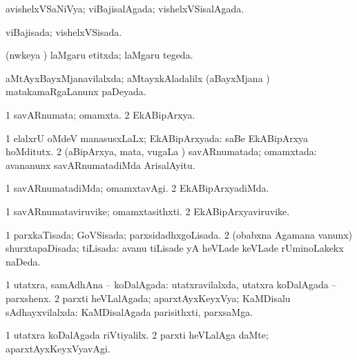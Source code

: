 \bentry
{} 
\gl{\gu}
\expl{}
\bmng
avishelxVSaNiVya; viBajisalAgada; vishelxVSisalAgada. 
\emng
\eentry

\bentry
{} 
\gl{\gu}
\expl{}
\bmng
viBajisada; vishelxVSisada. 
\emng
\eentry

\bentry
{} 
\gl{\gu}
\expl{}
\bmng
(nwkeya \vi) laMgaru etitxda; laMgaru tegeda. 
\emng
\eentry

\bentry
{} 
\gl{\gu}
\expl{(\roVkAyx) (\pArxparx) }
\bmng
aMtAyxBayxMjanavilalxda; aMtayxkAladalilx (aBayxMjana \mo) matakamaRgaLanunx paDeyada. 
\emng
\eentry

\bentry
{} 
\gl{\nA}
\expl{}
\bmng
\bnum
\num{1} savARnumata; omamxta. 
\num{2} EkABipArxya. 
\enum
\emng
\eentry

\bentry
{} 
\gl{\gu}
\expl{}
\bmng
\bnum
\num{1} elalxrU oMdeV manasusxLaLx; EkABipArxyada:  saBe EkABipArxya hoMditutx. 
\num{2} (aBipArxya, mata, \mo vugaLa \vi) savARnumatada; omamxtada:  avananunx savARnumatadiMda ArisalAyitu. 
\enum
\emng
\eentry

\bentry
{} 
\gl{\kirxvi}
\expl{}
\bmng
\bnum
\num{1} savARnumatadiMda; omamxtavAgi. 
\num{2} EkABipArxyadiMda. 
\enum
\emng
\eentry

\bentry
{} 
\gl{\nA}
\expl{}
\bmng
\bnum
\num{1} savARnumataviruvike; omamxtasithxti. 
\num{2} EkABipArxyaviruvike. 
\enum
\emng
\eentry

\bentry
{} 
\gl{\gu}
\expl{}
\bmng
\bnum
\num{1} parxkaTisada; GoVSisada; parxsidadhxgoLisada. 
\num{2} (obabxna Agamana \mo vanunx) shurxtapaDisada; tiLisada:  avanu tiLisade yA heVLade keVLade rUminoLakekx naDeda. 
\enum
\emng
\eentry

\bentry
{} 
\gl{\gu}
\expl{}
\bmng
\bnum
\num{1} utatxra, samAdhAna -- koDalAgada:  utatxravilalxda, utatxra koDalAgada -- parxshenx. 
\num{2} parxti heVLalAgada; aparxtAyxKeyxVya; KaMDisalu sAdhayxvilalxda:  KaMDisalAgada parisithxti, parxsaMga. 
\enum
\emng
\eentry

\bentry
{} 
\gl{\kirxvi}
\expl{}
\bmng
\bnum
\num{1} utatxra koDalAgada riVtiyalilx. 
\num{2} parxti heVLalAga daMte; aparxtAyxKeyxVyavAgi. 
\enum
\emng
\eentry

